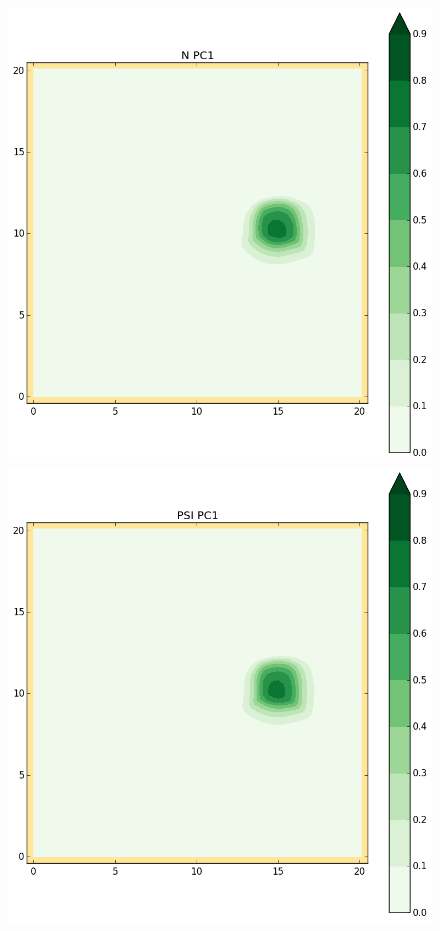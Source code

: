 \begin{figure}[h!]
\begin{minipage}[t]{0.50\textwidth}
\end{minipage}%
\begin{minipage}[t]{0.50\textwidth}
 \centering
 \includegraphics[trim=19mm 19mm 35mm 21mm,clip,scale=0.28]{../img/figure_PC_N1.png}
\end{minipage}
\begin{minipage}[t]{0.50\textwidth}
 \centering
 \includegraphics[trim=19mm 19mm 35mm 21mm,clip,scale=0.28]{../img/figure_PC_PSI1.png}

\end{minipage}
\end{figure}
